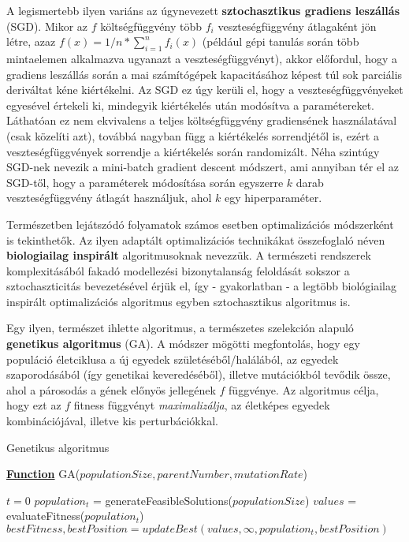 A legismertebb ilyen variáns az úgynevezett \textbf{sztochasztikus gradiens leszállás} (SGD). Mikor az $f$ költségfüggvény több $f_i$ veszteségfüggvény átlagaként jön létre, azaz $f(x) = 1/n * \sum_{i=1}^{n} f_i(x)$ (például gépi tanulás során több mintaelemen alkalmazva ugyanazt a veszteségfüggvényt), akkor előfordul, hogy a gradiens leszállás során a mai számítógépek kapacitásához képest túl sok parciális deriváltat kéne kiértékelni. Az SGD ez úgy kerüli el, hogy a veszteségfüggvényeket egyesével értekeli ki, mindegyik kiértékelés után modósítva a paramétereket. Láthatóan ez nem ekvivalens a teljes költségfüggvény gradiensének használatával (csak közelíti azt), továbbá nagyban függ a kiértékelés sorrendjétől is, ezért a veszteségfüggvények sorrendje a kiértékelés során randomizált. Néha szintúgy SGD-nek nevezik a mini-batch gradient descent módszert, ami annyiban tér el az SGD-től, hogy a paraméterek módosítása során egyszerre $k$ darab veszteségfüggvény átlagát használjuk, ahol $k$ egy hiperparaméter.


Természetben lejátszódó folyamatok számos esetben optimalizációs módszerként is tekinthetők. Az ilyen adaptált optimalizációs technikákat összefoglaló néven \textbf{biologiailag inspirált} algoritmusoknak nevezzük. A természeti rendszerek komplexitásából fakadó modellezési bizonytalanság feloldását sokszor a sztochaszticitás bevezetésével érjük el, így - gyakorlatban - a legtöbb biológiailag inspirált optimalizációs algoritmus egyben sztochasztikus algoritmus is.


Egy ilyen, természet ihlette algoritmus, a természetes szelekción alapuló \textbf{genetikus algoritmus} (GA)\cite{genetic_algorithm, non_gradient_optimization}. A módszer mögötti megfontolás, hogy egy populáció életciklusa a új egyedek születéséből/halálából, az egyedek szaporodásából (így genetikai keveredéséből), illetve mutációkból tevődik össze, ahol a párosodás a gének előnyös jellegének $f$ függvénye. Az algoritmus célja, hogy ezt az $f$ fitness függvényt \textit{maximalizálja}, az életképes egyedek kombinációjával, illetve kis perturbációkkal.

\begin{algorithm}[H]
\caption{Genetikus algoritmus}
\label{alg:ga} 
\textbf{\underline{Function}} GA($populationSize, parentNumber, mutationRate$)
\begin{algorithmic}[1] %
\STATE $t = 0$
\STATE $population_t$ = generateFeasibleSolutions($populationSize$)
\STATE $values$ = evaluateFitness($population_t$)
\STATE $bestFitness, bestPosition = updateBest(values, \infty, population_t, bestPosition)$
\end{algorithmic}
\end{algorithm}

